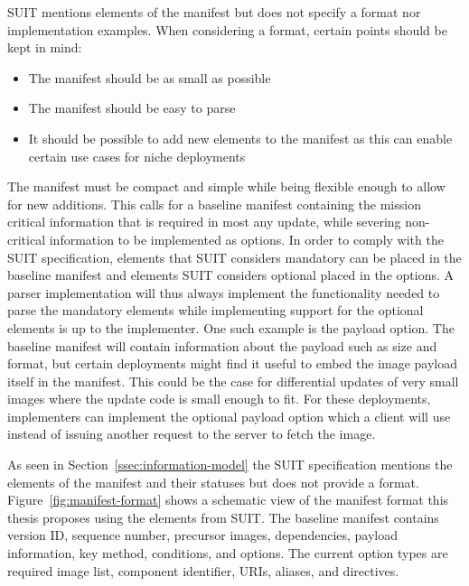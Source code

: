 \documentclass[0-thesis.tex]{subfiles}
\begin{document}
SUIT mentions elements of the manifest but does not specify a format nor implementation
examples. When considering a format, certain points should be kept in mind:

\begin{itemize}
        \item The manifest should be as small as possible
        \item The manifest should be easy to parse
        \item It should be possible to add new elements to the manifest as this can enable
                certain use cases for niche deployments
\end{itemize}

The manifest must be compact and simple while being flexible enough to allow for new
additions. This calls for a baseline manifest containing the mission critical information
that is required in most any update, while severing non-critical information to be
implemented as options. In order to comply with the SUIT specification, elements that SUIT
considers mandatory can be placed in the baseline manifest and elements SUIT considers
optional placed in the options. A parser implementation will thus always implement the
functionality needed to parse the mandatory elements while implementing support for the
optional elements is up to the implementer. One such example is the payload option. The
baseline manifest will contain information about the payload such as size and format, but
certain deployments might find it useful to embed the image payload itself in the
manifest. This could be the case for differential updates of very small images where the
update code is small enough to fit. For these deployments, implementers can implement the
optional payload option which a client will use instead of issuing another request to the
server to fetch the image.

As seen in Section~\ref{ssec:information-model} the SUIT specification mentions the
elements of the manifest and their statuses but does not provide a format.
Figure~\ref{fig:manifest-format} shows a schematic view of the manifest format this thesis
proposes using the elements from SUIT. The baseline manifest contains version ID, sequence
number, precursor images, dependencies, payload information, key method, conditions, and
options. The current option types are required image list, component identifier, URIs,
aliases, and directives.
\end{document}
